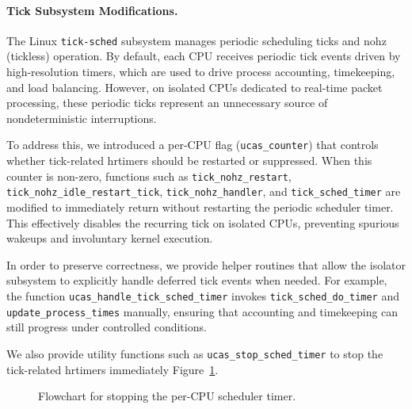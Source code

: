 \documentclass[letterpaper]{article}
\begin{document}
\paragraph{Tick Subsystem Modifications.}
The Linux \texttt{tick-sched} subsystem manages periodic scheduling ticks and 
nohz (tickless) operation. By default, each CPU receives periodic tick events 
driven by high-resolution timers, which are used to drive process accounting, 
timekeeping, and load balancing. However, on isolated CPUs dedicated to 
real-time packet processing, these periodic ticks represent an unnecessary 
source of nondeterministic interruptions.

To address this, we introduced a per-CPU flag (\texttt{ucas\_counter}) that 
controls whether tick-related hrtimers should be restarted or suppressed. When 
this counter is non-zero, functions such as \texttt{tick\_nohz\_restart}, 
\texttt{tick\_nohz\_idle\_restart\_tick}, \texttt{tick\_nohz\_handler}, 
and \texttt{tick\_sched\_timer} are modified to immediately return without 
restarting the periodic scheduler timer. This effectively disables the 
recurring tick on isolated CPUs, preventing spurious wakeups and involuntary 
kernel execution.

In order to preserve correctness, we provide helper routines that allow the 
isolator subsystem to explicitly handle deferred tick events when needed. For 
example, the function \texttt{ucas\_handle\_tick\_sched\_timer} invokes 
\texttt{tick\_sched\_do\_timer} and \texttt{update\_process\_times} 
manually, ensuring that accounting and timekeeping can still progress under 
controlled conditions.

We also provide utility functions such as \texttt{ucas\_stop\_sched\_timer} to stop
the tick-related hrtimers immediately Figure~\ref{fig:stoptick}.

\begin{figure}[t]
\centering
{}
\caption{Flowchart for stopping the per-CPU scheduler timer.}
\label{fig:stoptick}
\end{figure}
\end{document}
